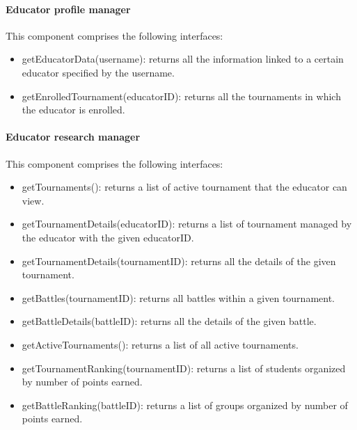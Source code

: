 \documentclass[12pt, a4paper]{report}
\begin{document}
    \paragraph*{Educator profile manager}
    This component comprises the following interfaces: 
    \begin{itemize}
        \item getEducatorData(username): returns all the information linked to a certain educator specified by the username. 
        \item getEnrolledTournament(educatorID): returns all the tournaments in which the educator is enrolled. 
    \end{itemize}

    \paragraph*{Educator research manager}
    This component comprises the following interfaces: 
    \begin{itemize}
        \item getTournaments(): returns a list of active tournament that the educator can view. 
        \item getTournamentDetails(educatorID): returns a list of tournament managed by the educator with the given educatorID. 
        \item getTournamentDetails(tournamentID): returns all the details of the given tournament. 
        \item getBattles(tournamentID): returns all battles within a given tournament. 
        \item getBattleDetails(battleID): returns all the details of the given battle. 
        \item getActiveTournaments(): returns a list of all active tournaments.
        \item getTournamentRanking(tournamentID): returns a list of students organized by number of points earned. 
        \item getBattleRanking(battleID): returns a list of groups organized by number of points earned. 
    \end{itemize}
\end{document}
